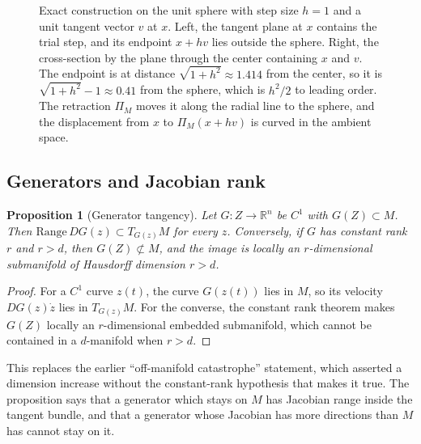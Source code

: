 \documentclass[11pt,a4paper]{article}
\newtheorem{proposition}[theorem]{Proposition}
\theoremstyle{definition}
\theoremstyle{remark}
\newcommand{\R}{\mathbb{R}}
\newcommand{\TM}[1]{T_{#1}M}
\begin{document}
\begin{figure}[ht]
\begin{minipage}[c]{0.42\linewidth}
\end{minipage}
\caption{Exact construction on the unit sphere with step size $h=1$ and a
unit tangent vector $v$ at $x$. Left, the tangent plane at $x$ contains the
trial step, and its endpoint $x+hv$ lies outside the sphere. Right, the
cross-section by the plane through the center containing $x$ and $v$. The
endpoint is at distance $\sqrt{1+h^2}\approx1.414$ from the center, so it is
$\sqrt{1+h^2}-1\approx0.41$ from the sphere, which is $h^2/2$ to leading
order. The retraction $\Pi_M$ moves it along the radial line to the sphere,
and the displacement from $x$ to $\Pi_M(x+hv)$ is curved in the ambient
space.}
\label{fig:euler}
\end{figure}

\subsection{Generators and Jacobian rank}

\begin{proposition}[Generator tangency]\label{prop:generator}
Let $G:Z\to\R^n$ be $C^1$ with $G(Z)\subset M$. Then
$\mathrm{Range}\,DG(z)\subset T_{G(z)}M$ for every $z$. Conversely, if
$G$ has constant rank $r$ and $r>d$, then $G(Z)\not\subset M$, and the
image is locally an $r$-dimensional submanifold of Hausdorff dimension $r>d$.
\end{proposition}

\begin{proof}
For a $C^1$ curve $z(t)$, the curve $G(z(t))$ lies in $M$, so its
velocity $DG(z)\dot z$ lies in $T_{G(z)}M$. For the converse, the
constant rank theorem makes $G(Z)$ locally an $r$-dimensional embedded
submanifold, which cannot be contained in a $d$-manifold when $r>d$.
\end{proof}

This replaces the earlier ``off-manifold catastrophe'' statement, which
asserted a dimension increase without the constant-rank hypothesis that
makes it true. The proposition says that a generator which stays on $M$
has Jacobian range inside the tangent bundle, and that a generator whose
Jacobian has more directions than $M$ has cannot stay on it.
\end{document}
